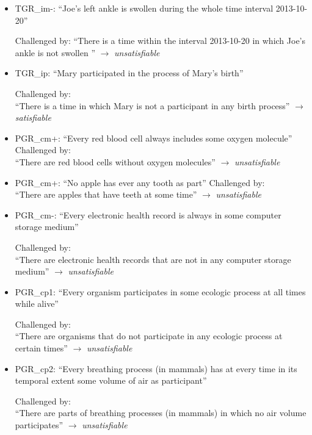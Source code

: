 \begin{itemize}
\item TGR\_im-: ``Joe's left ankle is swollen during the whole time interval 2013-10-20''


Challenged by: 
``There is a time within the interval 2013-10-20 in which Joe's ankle is not swollen '' 
$\rightarrow$ \emph{unsatisfiable}



\item TGR\_ip:  ``Mary participated in the process of Mary's birth''

Challenged by: \\``There is a time in which Mary is not a participant in any birth process''  
$\rightarrow$ \emph{satisfiable}



\item 
PGR\_cm+: ``Every red blood cell always includes some oxygen molecule''
Challenged by: \\``There are red blood cells without oxygen molecules''  
$\rightarrow$ \emph{unsatisfiable}

\item
PGR\_cm+: ``No apple has ever any tooth as part''
Challenged by: \\``There are apples that have teeth at some time''  
$\rightarrow$ \emph{unsatisfiable}

\item PGR\_cm-: ``Every electronic health record is always in some computer storage medium''

Challenged by: \\``There are electronic health records that are not in any computer storage medium''  
$\rightarrow$ \emph{unsatisfiable}


\item PGR\_cp1: ``Every organism participates in some ecologic process at all times while alive''

Challenged by: \\``There are organisms that do not participate in any ecologic process at certain times''  
$\rightarrow$ \emph{unsatisfiable}


\item PGR\_cp2: ``Every breathing process (in mammals) has at every time in its temporal extent some volume of air as participant'' 


Challenged by: \\``There are parts of breathing processes (in mammals) in which no air volume participates''  
$\rightarrow$ \emph{unsatisfiable}



\end{itemize}
